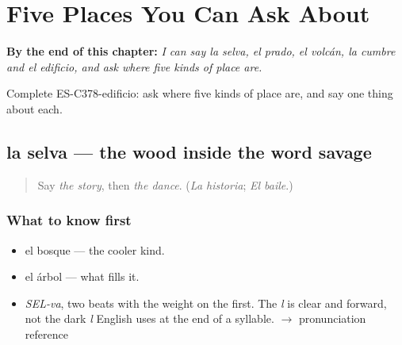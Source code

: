 
\chapter{Five Places You Can Ask About}
\label{ch:la-selva-y-el-prado}

\begin{chapteropening}
\textbf{By the end of this chapter:} \emph{I can say la selva, el prado, el volcán, la cumbre and el edificio, and ask where five kinds of place are.}

Complete ES-C378-edificio: ask where five kinds of place are, and say one thing about each.
\end{chapteropening}

\section[la selva]{la selva — the wood inside the word savage}

\label{lesson:ES-C378-selva}



\begin{quote}
Say \emph{the story}, then \emph{the dance}. (\emph{La historia}; \emph{El baile}.)
\end{quote}

\subsection*{What to know first}
\begin{itemize}
\raggedright
  \item el bosque — the cooler kind.
  \item el árbol — what fills it.
\end{itemize}

\begin{sounds}
\begin{itemize}
\raggedright
  \item \emph{SEL-va}, two beats with the weight on the first. The \emph{l} is clear and forward, not the dark \emph{l} English uses at the end of a syllable. $\to$ pronunciation reference
\end{itemize}
\end{sounds}

